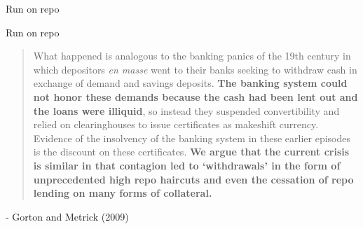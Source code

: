 

\begin{frame}{Run on repo}

\begin{figure}
\begin{center}


\end{center}
\end{figure}

\end{frame}



\begin{frame}{Run on repo}

\begin{quote}
What happened is analogous to the banking panics of the 19th century in which depositors \emph{en masse} went to their banks seeking to withdraw cash in exchange of demand and savings deposits. \textbf{The banking system could not honor these demands because the cash had been lent out and the loans were illiquid}, so instead they suspended convertibility and relied on clearinghouses to issue certificates as makeshift currency. Evidence of the insolvency of the banking system in these earlier episodes is the discount on these certificates. \textbf{We argue that the current crisis is similar in that contagion led to `withdrawals' in the form of unprecedented high repo haircuts and even the cessation of repo lending on many forms of collateral.}
\end{quote}
\begin{center}
- Gorton and Metrick (2009)
\end{center}

\end{frame}

